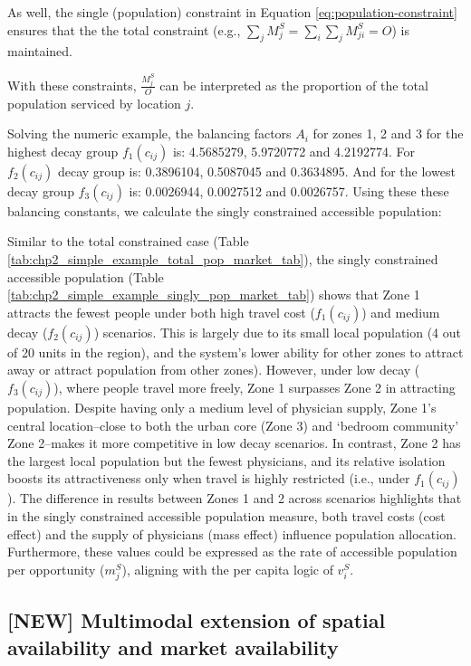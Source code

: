 \documentclass[
11pt, %
oneside, %
english, %
singlespacing, %
]{macthesis} %
\begin{document}
As well, the single (population) constraint in Equation \ref{eq:population-constraint} ensures that the the total constraint (e.g., \(\sum_j M^S_{j} = \sum_i\sum_j  M^S_{ji} = O\)) is maintained.

With these constraints, \(\frac{M_j^S}{O}\) can be interpreted as the proportion of the total population serviced by location \(j\).

Solving the numeric example, the balancing factors \(A_i\) for zones 1, 2 and 3 for the highest decay group \(f_1(c_{ij})\) is: 4.5685279, 5.9720772 and 4.2192774. For \(f_2(c_{ij})\) decay group is: 0.3896104, 0.5087045 and 0.3634895. And for the lowest decay group \(f_3(c_{ij})\) is: 0.0026944, 0.0027512 and 0.0026757. Using these these balancing constants, we calculate the singly constrained accessible population:



Similar to the total constrained case (Table \ref{tab:chp2_simple_example_total_pop_market_tab}), the singly constrained accessible population (Table \ref{tab:chp2_simple_example_singly_pop_market_tab}) shows that Zone 1 attracts the fewest people under both high travel cost (\(f_1(c_{ij})\)) and medium decay (\(f_2(c_{ij})\)) scenarios. This is largely due to its small local population (4 out of 20 units in the region), and the system's lower ability for other zones to attract away or attract population from other zones). However, under low decay (\(f_3(c_{ij})\)), where people travel more freely, Zone 1 surpasses Zone 2 in attracting population. Despite having only a medium level of physician supply, Zone 1's central location--close to both the urban core (Zone 3) and `bedroom community' Zone 2--makes it more competitive in low decay scenarios. In contrast, Zone 2 has the largest local population but the fewest physicians, and its relative isolation boosts its attractiveness only when travel is highly restricted (i.e., under \(f_1(c_{ij})\)). The difference in results between Zones 1 and 2 across scenarios highlights that in the singly constrained accessible population measure, both travel costs (cost effect) and the supply of physicians (mass effect) influence population allocation. Furthermore, these values could be expressed as the rate of accessible population per opportunity (\(m_j^S\)), aligning with the per capita logic of \(v_i^S\).

\subsection{{[}NEW{]} Multimodal extension of spatial availability and market availability}\label{new-multimodal-extension-of-spatial-availability-and-market-availability}
\end{document}
